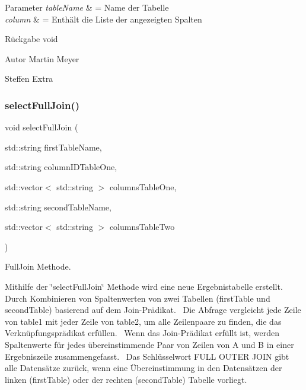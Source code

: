 \begin{DoxyParams}{Parameter}
{\em table\+Name} & = Name der Tabelle \\
\hline
{\em column} & = Enthält die Liste der angezeigten Spalten\\
\hline
\end{DoxyParams}
\begin{DoxyReturn}{Rückgabe}
void
\end{DoxyReturn}
\begin{DoxyAuthor}{Autor}
Martin Meyer 

Steffen Extra 
\end{DoxyAuthor}
\mbox{\label{selection_request_8cpp_a41392b97718c999af4867dc0c62ade0c}} 
\subsubsection{select\+Full\+Join()}
{\footnotesize\ttfamily void select\+Full\+Join (\begin{DoxyParamCaption}\item[{std\+::string}]{first\+Table\+Name,  }\item[{std\+::string}]{column\+I\+D\+Table\+One,  }\item[{std\+::vector$<$ std\+::string $>$}]{columns\+Table\+One,  }\item[{std\+::string}]{second\+Table\+Name,  }\item[{std\+::vector$<$ std\+::string $>$}]{columns\+Table\+Two }\end{DoxyParamCaption})}



Full\+Join Methode. 

Mithilfe der \char`\"{}select\+Full\+Join\char`\"{} Methode wird eine neue Ergebnistabelle erstellt.~\newline
 Durch Kombinieren von Spaltenwerten von zwei Tabellen (first\+Table und second\+Table) basierend auf dem Join-\/\+Prädikat.~\newline
 Die Abfrage vergleicht jede Zeile von table1 mit jeder Zeile von table2, um alle Zeilenpaare zu finden, die das Verknüpfungsprädikat erfüllen.~\newline
 Wenn das Join-\/\+Prädikat erfüllt ist, werden Spaltenwerte für jedes übereinstimmende Paar von Zeilen von A und B in einer Ergebniszeile zusammengefasst.~\newline
 Das Schlüsselwort F\+U\+LL O\+U\+T\+ER J\+O\+IN gibt alle Datensätze zurück, wenn eine Übereinstimmung in den Datensätzen der linken (first\+Table) oder der rechten (second\+Table) Tabelle vorliegt.~\newline


